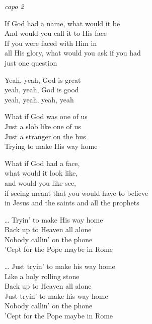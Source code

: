 
\re{}\textit{capo 2}

\ve{}
If God had a name, what would it be\\
And would you call it to His face\\
If you were faced with Him in\\
all His glory, what would you ask if you had\\
just one question \quad {} 

\cho{}
Yeah, yeah, God is great\\
yeah, yeah, God is good\\
yeah, yeah, yeah, yeah

What if God was one of us \quad {}\\
Just a slob like one of us \quad {}\\
Just a stranger on the bus\\
Trying to make His way home \quad {} \quad {}

\ve{}
What if God had a face,\\
what would it look like,\\
and would you like see,\\
if seeing meant that you would have to believe\\
in Jesus and the saints and all the prophets

\cho{}
\ldots{} Tryin' to make His way home\\
Back up to Heaven all alone\\
Nobody callin' on the phone\\
'Cept for the Pope maybe in Rome


\cho{}
\ldots{} Just tryin' to make his way home\\
Like a holy rolling stone\\
Back up to Heaven all alone\\
Just tryin' to make his way home\\
Nobody callin' on the phone\\
'Cept for the Pope maybe in Rome

\esong{}